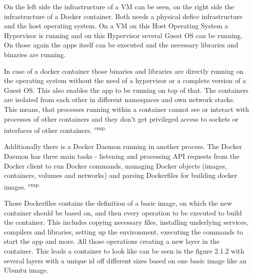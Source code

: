 On the left side the infrastructure of a VM can be seen, on the right side the infrastructure of a Docker container. Both needs a physical defice infrastructure and the host operating system. On a VM on this Host Operating System a Hypervisor is running and on this Hypervisor several Guest OS can be running. On those again the apps itself can be executed and the necessary libraries and binaries are running.

In case of a docker container those binaries and libraries are directly running on the operating system without the need of a hypervisor or a complete version of a Guest OS. This also enables the app to be running on top of that. The containers are isolated from each other in different namespaces and own network stacks. This means, that processes running within a container cannot see or interact with processes of other containers and they don't get privileged access to sockets or interfaces of other containers. \textsuperscript{cmp.\cite{14}}


Additionally there is a Docker Daemon running in another process. The Docker Daemon has three main tasks - listening and processing API requests from the Docker client to run Docker commands, managing Docker objects (images, containers, volumes and networks) and parsing Dockerfiles for building docker images. \textsuperscript{cmp.\cite{15}}


Those Dockerfiles contains the definition of a basic image, on which the new container should be based on, and then every operation to be executed to build the container. This includes copying necessary files, installing underlying services, compilers and libraries, setting up the environment, executing the commands to start the app and more. All those operations creating a new layer in the container. This leads a container to look like can be seen in the figure 2.1.2 with several layers with a unique id off different sizes based on one basic image like an Ubuntu image.

